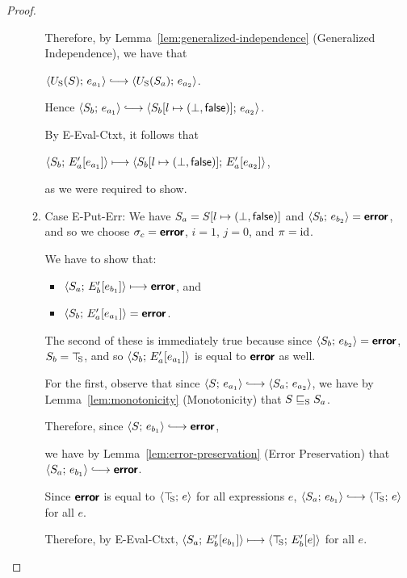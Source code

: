 \begin{proof}
\begin{enumerate}
\begin{enumerate}
      Therefore, by Lemma~\ref{lem:generalized-independence}
      (Generalized Independence), we have that

      $\config{\Ustore(S)}{e_{a_1}} \parstepsto
      \config{\Ustore(S_a)}{e_{a_2}}$.

      Hence $\config{S_b}{e_{a_1}}
      \parstepsto
      \config{\extS{S_b}{l}{\bot}{\frozenfalse}}{e_{a_2}}$.

      By {\sc E-Eval-Ctxt}, it follows that
      
      $\langle S_b;\, E'_a\hspace{-0.5mm}\left[e_{a_1}\right] \rangle \longmapsto
      \langle S_b[l \mapsto (\bot, \textsf{false})];\, E'_a\hspace{-0.5mm}\left[e_{a_2}\right] \rangle$,
      
      as we were required to show.

    \item \label{slqc-new-put-err}Case {\sc E-Put-Err}: We have $S_a =
      S[l \mapsto (\bot, \textsf{false})]$ and $\langle S_b;\, e_{b_2} \rangle =
      \textbf{\textsf{error}}$, and so we choose $\sigma_c = \textbf{\textsf{error}}$, $i = 1$, $j = 0$,
      and $\pi = \mathrm{id}$.

      We have to show that:
      \begin{itemize}
      \item $\langle S_a;\, E'_b\hspace{-0.5mm}\left[e_{b_1}\right] \rangle \longmapsto
        \textbf{\textsf{error}}$, and
      \item $\langle S_b;\, E'_a\hspace{-0.5mm}\left[e_{a_1}\right] \rangle = \textbf{\textsf{error}}$.
      \end{itemize}

      The second of these is immediately true because since
      $\langle S_b;\, e_{b_2} \rangle = \textbf{\textsf{error}}$, $S_b = \top\hspace{-0.85mm}_{\mathrm{S}}$, and so
      $\langle S_b;\, E'_a\hspace{-0.5mm}\left[e_{a_1}\right] \rangle$ is equal to $\textbf{\textsf{error}}$ as
      well.

      For the first, observe that since $\config{S}{e_{a_1}}
      \parstepsto \config{S_a}{e_{a_2}}$, we have by
      Lemma~\ref{lem:monotonicity} (Monotonicity) that
      $S \sqsubseteq_{\mathrm{S}} S_a$.

      Therefore, since $\config{S}{e_{b_1}} \parstepsto \error$,

      we have by Lemma~\ref{lem:error-preservation} (Error
      Preservation) that $\config{S_a}{e_{b_1}} \parstepsto \error$.

      Since $\textbf{\textsf{error}}$ is equal to $\langle \top\hspace{-0.85mm}_{\mathrm{S}};\, e \rangle$ for all
      expressions $e$, $\config{S_a}{e_{b_1}} \parstepsto
      \config{\topS}{e}$ for all $e$.

      Therefore, by {\sc E-Eval-Ctxt},
      $\langle S_a;\, E'_b\hspace{-0.5mm}\left[e_{b_1}\right] \rangle \longmapsto
      \langle \top\hspace{-0.85mm}_{\mathrm{S}};\, E'_b\hspace{-0.5mm}\left[e\right] \rangle$ for all $e$.


\end{enumerate}
\end{enumerate}
\end{proof}

